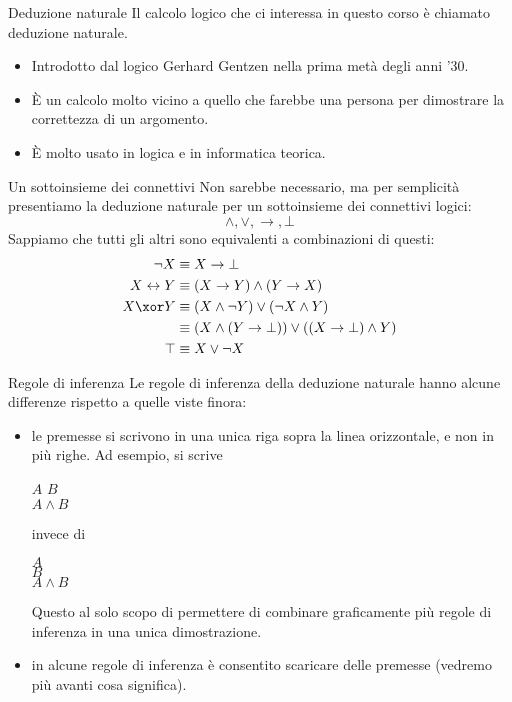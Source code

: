\documentclass[aspectratio=169,10pt,dvipsnames,xcolor=table,handout]{beamer}
\begin{document}
\begin{frame}{Deduzione naturale}
    Il calcolo logico che ci interessa in questo corso è chiamato \alert{deduzione naturale}.
    \begin{itemize}
        \item Introdotto dal logico Gerhard Gentzen nella prima metà degli anni '30.
        \item È un calcolo molto vicino a quello che farebbe una persona per dimostrare la correttezza di un argomento.
        \item È molto usato in logica e in informatica teorica.
    \end{itemize}
\end{frame}

\begin{frame}{Un sottoinsieme dei connettivi}
    Non sarebbe necessario, ma per semplicità presentiamo la deduzione naturale per un sottoinsieme dei connettivi logici:
    \[
    \land, \lor, \to, \bot
    \]
    Sappiamo che tutti gli altri sono equivalenti a combinazioni di questi:
    \begin{align*}
        \neg X &\equiv X \to \bot\\
        X \leftrightarrow Y &\equiv (X \to Y) \land (Y \to X)\\
        X \xor Y &\equiv (X \land \neg Y) \lor (\neg X \land Y)\\
        & \equiv (X \land (Y \to \bot)) \lor ((X \to \bot) \land Y)\\
        \top & \equiv X \lor \neg X
    \end{align*}
\end{frame}

\begin{frame}{Regole di inferenza}
    Le regole di inferenza della deduzione naturale hanno alcune differenze rispetto a quelle viste finora:
    \begin{itemize}
    \item le premesse si scrivono in una unica riga sopra la linea orizzontale, e non in più righe. Ad esempio, si scrive
    \begin{center}
        \begin{inference}
            $A$ \qquad $B$\\
            \hline
            $A \land B$
        \end{inference}
        \qquad invece di \qquad
        \begin{inference}
            $A$ \\
            $B$\\
            \hline
            $A \land B$
        \end{inference}
    \end{center}

    Questo al solo scopo di permettere di combinare graficamente più regole di inferenza in una unica \alert{dimostrazione}.
    \item in alcune regole di inferenza è consentito \alert{scaricare} delle premesse (vedremo più avanti cosa significa).
    \end{itemize}
\end{frame}
\end{document}
